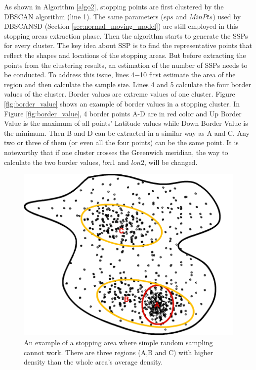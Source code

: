 \documentclass[12pt,glossary]{dalcsthesis}
\begin{document}
As shown in Algorithm \ref{algo2}, stopping points are first clustered by the DBSCAN \cite{DBScan96} algorithm (line 1). The same parameters ($eps$ and $MinPts$) used by DBSCANSD (Section \ref{sec:normal_moving_model}) are still employed in this stopping areas extraction phase. Then the algorithm starts to generate the SSPs for every cluster. The key idea about SSP is to find the representative points that reflect the shapes and locations of the stopping areas. But before extracting the points from the clustering results, an estimation of the number of SSPs needs to be conducted. To address this issue,  lines 4$-$10 first estimate the area of the region and then calculate the sample size. Lines 4 and 5 calculate the four border values of the cluster. Border values are extreme values of one cluster. Figure \ref{fig:border_value} shows an example of border values in a stopping cluster. In Figure \ref{fig:border_value}, 4 border points A-D are in red color and Up Border Value is the maximum of all points' Latitude values while Down Border Value is the minimum. Then B and D can be extracted in a similar way as A and C. Any two or three of them (or even all the four points) can be the same point. It is noteworthy that if one cluster crosses the Greenwich meridian, the way to calculate the two border values, $lon1$ and $lon2$, will be changed. 

\begin{figure}[!htb]
\centering
\includegraphics[width=4.5in]{stopExample.png}
\caption{An example of a stopping area where simple random sampling cannot work. There are three regions (A,B and C) with higher density than the whole area's average density.}
\label{fig:stopping_area}
\end{figure}
\end{document}
